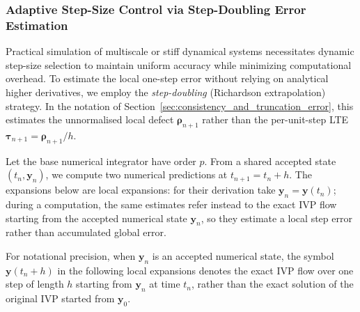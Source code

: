 \subsubsection{Adaptive Step-Size Control via Step-Doubling Error Estimation}
Practical simulation of multiscale or stiff dynamical systems necessitates dynamic step-size selection to maintain uniform accuracy while minimizing computational overhead. To estimate the local one-step error without relying on analytical higher derivatives, we employ the \emph{step-doubling} (Richardson extrapolation) strategy. In the notation of Section~\ref{sec:consistency_and_truncation_error}, this estimates the unnormalised local defect $\boldsymbol{\rho}_{n+1}$ rather than the per-unit-step LTE $\boldsymbol{\tau}_{n+1}=\boldsymbol{\rho}_{n+1}/h$.

Let the base numerical integrator have order $p$. From a shared accepted state $(t_n, \mathbf{y}_n)$, we compute two numerical predictions at $t_{n+1} = t_n + h$. The expansions below are local expansions: for their derivation take $\mathbf y_n=\mathbf y(t_n)$; during a computation, the same estimates refer instead to the exact IVP flow starting from the accepted numerical state $\mathbf y_n$, so they estimate a local step error rather than accumulated global error.

For notational precision, when $\mathbf y_n$ is an accepted numerical state,
the symbol $\mathbf y(t_n+h)$ in the following local expansions denotes the
exact IVP flow over one step of length $h$ starting from $\mathbf y_n$ at
time $t_n$, rather than the exact solution of the original IVP started from
$\mathbf y_0$.

